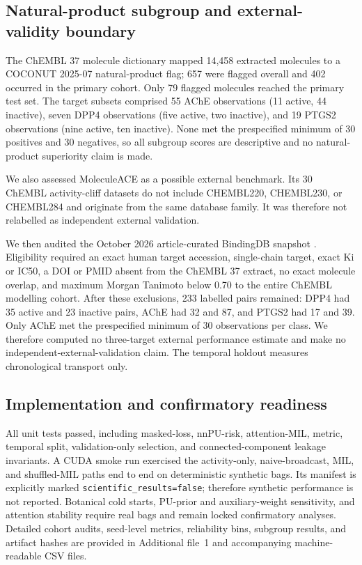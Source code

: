 \documentclass[11pt]{article}
\begin{document}
\subsection{Natural-product subgroup and external-validity boundary}

The ChEMBL 37 molecule dictionary mapped 14,458 extracted molecules to a
COCONUT 2025-07 natural-product flag; 657 were flagged overall and 402 occurred
in the primary cohort. Only 79 flagged molecules reached the primary test set.
The target subsets comprised 55 AChE observations (11 active, 44 inactive),
seven DPP4 observations (five active, two inactive), and 19 PTGS2 observations
(nine active, ten inactive). None met the prespecified minimum of 30 positives
and 30 negatives, so all subgroup scores are descriptive and no natural-product
superiority claim is made.

We also assessed MoleculeACE \citep{vanTilborg2022moleculeace} as a possible
external benchmark. Its 30 ChEMBL activity-cliff datasets do not include
CHEMBL220, CHEMBL230, or CHEMBL284 and originate from the same database family.
It was therefore not relabelled as independent external validation.

We then audited the October 2026 article-curated BindingDB snapshot
\citep{liu2025bindingdb}. Eligibility required an exact human target accession,
single-chain target, exact Ki or IC50, a DOI or PMID absent from the ChEMBL 37
extract, no exact molecule overlap, and maximum Morgan Tanimoto below 0.70 to
the entire ChEMBL modelling cohort. After these exclusions, 233 labelled pairs
remained: DPP4 had 35 active and 23 inactive pairs, AChE had 32 and 87, and
PTGS2 had 17 and 39. Only AChE met the prespecified minimum of 30 observations
per class. We therefore computed no three-target external performance estimate
and make no independent-external-validation claim. The temporal holdout measures
chronological transport only.

\subsection{Implementation and confirmatory readiness}

All unit tests passed, including masked-loss, nnPU-risk, attention-MIL,
metric, temporal split, validation-only selection, and connected-component leakage invariants. A CUDA smoke run exercised
the activity-only, naive-broadcast, MIL, and shuffled-MIL paths end to end on
deterministic synthetic bags. Its manifest is explicitly marked
\texttt{scientific\_results=false}; therefore synthetic performance is not
reported. Botanical cold starts, PU-prior and auxiliary-weight sensitivity,
and attention stability require real bags and remain locked confirmatory
analyses. Detailed cohort audits, seed-level metrics, reliability bins, subgroup
results, and artifact hashes are provided in Additional file~1 and accompanying
machine-readable CSV files.
\end{document}
